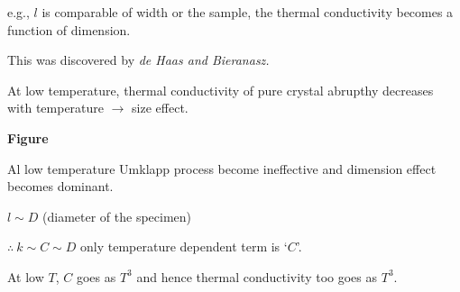 e.g., $l$ is comparable of width or the sample, the thermal conductivity becomes a function of dimension.

This was discovered by {\em de Haas and Bieranasz.}

At low temperature, thermal conductivity of pure crystal abrupthy decreases with temperature $\to$ size effect.
\begin{center}
{\bf Figure}
\end{center}

Al low temperature Umklapp process become ineffective and dimension effect becomes dominant.

$l\sim D$ (diameter of the specimen)

$\therefore \ k\sim C\sim D$ only temperature dependent term is `$C$'.

At low $T$, $C$ goes as $T^{3}$ and hence thermal conductivity too goes as $T^{3}$.
